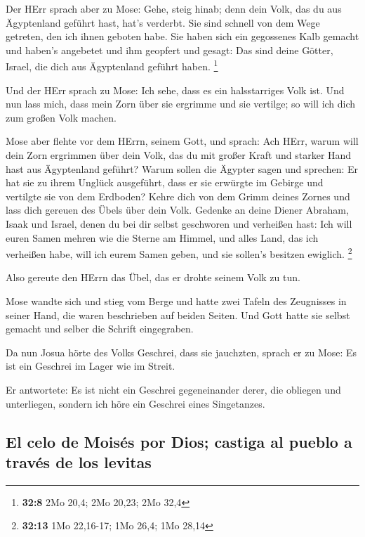  Der HErr sprach aber zu Mose: Gehe, steig hinab; denn
dein Volk, das du aus Ägyptenland geführt hast, hat's verderbt.
 Sie sind schnell von dem Wege getreten, den ich ihnen
geboten habe. Sie haben sich ein gegossenes Kalb gemacht und haben's
angebetet und ihm geopfert und gesagt: Das sind deine Götter, Israel,
die dich aus Ägyptenland geführt haben. \footnote{\textbf{32:8} 2Mo
  20,4; 2Mo 20,23; 2Mo 32,4}

 Und der HErr sprach zu Mose: Ich sehe, dass es ein
halsstarriges Volk ist.  Und nun lass mich, dass mein
Zorn über sie ergrimme und sie vertilge; so will ich dich zum großen
Volk machen.

 Mose aber flehte vor dem HErrn, seinem Gott, und sprach:
Ach HErr, warum will dein Zorn ergrimmen über dein Volk, das du mit
großer Kraft und starker Hand hast aus Ägyptenland geführt?
 Warum sollen die Ägypter sagen und sprechen: Er hat sie
zu ihrem Unglück ausgeführt, dass er sie erwürgte im Gebirge und
vertilgte sie von dem Erdboden? Kehre dich von dem Grimm deines Zornes
und lass dich gereuen des Übels über dein Volk.  Gedenke
an deine Diener Abraham, Isaak und Israel, denen du bei dir selbst
geschworen und verheißen hast: Ich will euren Samen mehren wie die
Sterne am Himmel, und alles Land, das ich verheißen habe, will ich eurem
Samen geben, und sie sollen's besitzen ewiglich. \footnote{\textbf{32:13}
  1Mo 22,16-17; 1Mo 26,4; 1Mo 28,14}

 Also gereute den HErrn das Übel, das er drohte seinem
Volk zu tun.

 Mose wandte sich und stieg vom Berge und hatte zwei
Tafeln des Zeugnisses in seiner Hand, die waren beschrieben auf beiden
Seiten.  Und Gott hatte sie selbst gemacht und selber die
Schrift eingegraben.

 Da nun Josua hörte des Volks Geschrei, dass sie
jauchzten, sprach er zu Mose: Es ist ein Geschrei im Lager wie im
Streit.

 Er antwortete: Es ist nicht ein Geschrei gegeneinander
derer, die obliegen und unterliegen, sondern ich höre ein Geschrei eines
Singetanzes.

\hypertarget{el-celo-de-moisuxe9s-por-dios-castiga-al-pueblo-a-travuxe9s-de-los-levitas}{%
\subsection{El celo de Moisés por Dios; castiga al pueblo a través de
los
levitas}\label{el-celo-de-moisuxe9s-por-dios-castiga-al-pueblo-a-travuxe9s-de-los-levitas}}

